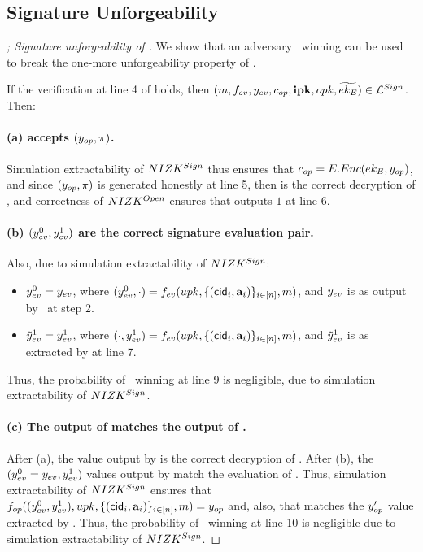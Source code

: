 \subsection{Signature Unforgeability}

\begin{proof}[; Signature unforgeability of \CUASGen]
  We show that an adversary \adv~winning \ExpForgeSign can be used to break the
  one-more unforgeability property of \SBCM.
 
  If the verification at line 4 of \ExpForgeSign holds, then $(m,f_{ev},
  y_{ev},c_{op},\mathbf{ipk},opk,\widetilde{ek_{E}}) \in \mathcal{L}^{Sign}$. Then:

  \paragraph{(a) \Judge accepts $(y_{op},\pi)$.} %
  Simulation extractability of $NIZK^{Sign}$ thus ensures that $c_{op} =
  E.Enc(ek_{E},y_{op})$, and since $(y_{op},\pi)$ is generated honestly at
  line 5, then \yinsp is the correct decryption of \cinsp, and  correctness of
  $NIZK^{Open}$ ensures that \Judge outputs $1$ at line 6.

  \paragraph{(b) $(y_{ev}^0,y_{ev}^1)$ are the correct signature evaluation
    pair.} Also, due to simulation extractability of $NIZK^{Sign}$:

  \begin{itemize}
  \item $y_{ev}^0 = y_{ev}$, where $(y_{ev}^0,\cdot) = f_{ev}(upk,\lbrace
    (\mathsf{cid}_i,\mathbf{a}_i) \rbrace_{i\in[n]},m)$, and $y_{ev}$ is as output by
    \adv~at step 2.    
  \item $\tilde{y}_{ev}^1 = y_{ev}^1$, where $(\cdot,y_{ev}^1) = f_{ev}(upk,\lbrace
    (\mathsf{cid}_i,\mathbf{a}_i)\rbrace_{i\in[n]},m)$, and $\tilde{y}_{ev}^1$ is as extracted
    by \ExtractSign at line 7.
  \end{itemize}

  Thus, the probability of \adv~winning at line 9 is negligible, due to
  simulation extractability of $NIZK^{Sign}$.

  \paragraph{(c) The output of \finsp matches the output of \Open.} %
  After (a), the \yinsp value output by \Open is the correct decryption of
  \cinsp. After (b), the $(y_{ev}^0=y_{ev},y_{ev}^1)$ values output by
  \ExtractSign match the evaluation of \feval. Thus, simulation extractability
  of $NIZK^{Sign}$ ensures that $f_{op}((y_{ev}^0,y_{ev}^1),upk,\lbrace
  (\mathsf{cid}_i,\mathbf{a}_i)\rbrace_{i\in[n]},m) = y_{op}$ and, also, that \yinsp
  matches the $y_{op}'$ value extracted by \ExtractSign. Thus, the probability
  of \adv~winning at line 10 is negligible due to simulation extractability
  of $NIZK^{Sign}$.


\end{proof}
